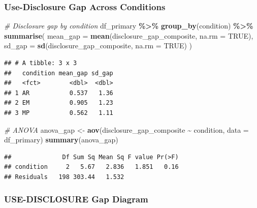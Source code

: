 \documentclass[
]{article}
\newenvironment{Shaded}{\begin{snugshade}}{\end{snugshade}}
\newcommand{\AttributeTok}[1]{\textcolor[rgb]{0.13,0.29,0.53}{#1}}
\newcommand{\CommentTok}[1]{\textcolor[rgb]{0.56,0.35,0.01}{\textit{#1}}}
\newcommand{\ConstantTok}[1]{\textcolor[rgb]{0.56,0.35,0.01}{#1}}
\newcommand{\FunctionTok}[1]{\textcolor[rgb]{0.13,0.29,0.53}{\textbf{#1}}}
\newcommand{\NormalTok}[1]{#1}
\newcommand{\OtherTok}[1]{\textcolor[rgb]{0.56,0.35,0.01}{#1}}
\newcommand{\SpecialCharTok}[1]{\textcolor[rgb]{0.81,0.36,0.00}{\textbf{#1}}}
\begin{document}
\subsubsection{Use-Disclosure Gap Across
Conditions}\label{use-disclosure-gap-across-conditions}

\begin{Shaded}
\begin{Highlighting}[]
\CommentTok{\# Disclosure gap by condition}
\NormalTok{df\_primary }\SpecialCharTok{\%\textgreater{}\%}
  \FunctionTok{group\_by}\NormalTok{(condition) }\SpecialCharTok{\%\textgreater{}\%}
  \FunctionTok{summarise}\NormalTok{(}
    \AttributeTok{mean\_gap =} \FunctionTok{mean}\NormalTok{(disclosure\_gap\_composite, }\AttributeTok{na.rm =} \ConstantTok{TRUE}\NormalTok{),}
    \AttributeTok{sd\_gap   =} \FunctionTok{sd}\NormalTok{(disclosure\_gap\_composite, }\AttributeTok{na.rm =} \ConstantTok{TRUE}\NormalTok{)}
\NormalTok{  )}
\end{Highlighting}
\end{Shaded}

\begin{verbatim}
## # A tibble: 3 x 3
##   condition mean_gap sd_gap
##   <fct>        <dbl>  <dbl>
## 1 AR           0.537   1.36
## 2 EM           0.905   1.23
## 3 MP           0.562   1.11
\end{verbatim}

\begin{Shaded}
\begin{Highlighting}[]
\CommentTok{\# ANOVA}
\NormalTok{anova\_gap }\OtherTok{\textless{}{-}} \FunctionTok{aov}\NormalTok{(disclosure\_gap\_composite }\SpecialCharTok{\textasciitilde{}}\NormalTok{ condition, }\AttributeTok{data =}\NormalTok{ df\_primary)}
\FunctionTok{summary}\NormalTok{(anova\_gap)}
\end{Highlighting}
\end{Shaded}

\begin{verbatim}
##              Df Sum Sq Mean Sq F value Pr(>F)
## condition     2   5.67   2.836   1.851   0.16
## Residuals   198 303.44   1.532
\end{verbatim}

\subsubsection{USE-DISCLOSURE Gap
Diagram}\label{use-disclosure-gap-diagram}
\end{document}
